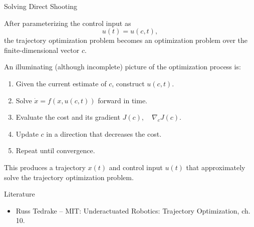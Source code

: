 \documentclass{beamer}
\begin{document}
\begin{frame}{Solving Direct Shooting}
	\begin{flushleft}
		After parameterizing the control input as
		\[
		u(t)=u(c,t),
		\]
		the trajectory optimization problem becomes an optimization
		problem over the finite-dimensional vector $c$.
		
		\vspace{0.5em}
		
		An illuminating (although incomplete) picture of the
		optimization process is:
		
		\begin{enumerate}
			\item Given the current estimate of $c$, construct
			$u(c,t)$.
			
			\item Solve $\dot{x}=f(x,u(c,t))$ forward in time.
			
			\item Evaluate the cost and its gradient $J(c),
			\quad
			\nabla_c J(c)$.
			
			\item Update $c$ in a direction that decreases the cost.
			
			\item Repeat until convergence.
		\end{enumerate}
		
		\vspace{0.5em}
		
		This produces a trajectory $x(t)$ and control input $u(t)$
		that approximately solve the trajectory optimization problem.
	\end{flushleft}
\end{frame}

\begin{frame}{Literature}
	
	\begin{itemize}
		
		
		\item Russ Tedrake -- MIT:
		{Underactuated Robotics: Trajectory Optimization, ch. 10.}
		
	\end{itemize}
	
\end{frame}



\myqrframe
\end{document}
